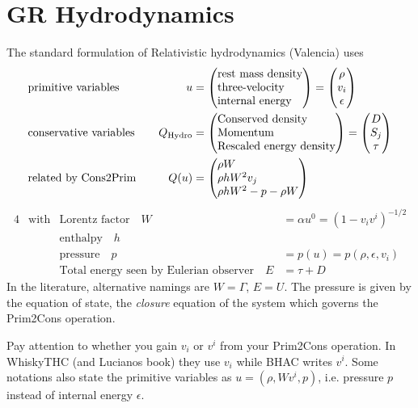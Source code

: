 \documentclass[a4paper]{article}
\newcommand{\desc}[1]{\text{#1}\quad}
\newcommand{\hydro}{\text{Hydro}}
\newenvironment{pvector}{\begin{pmatrix*}[l]}{\end{pmatrix*}}
\begin{document}
\section{GR Hydrodynamics}
The standard formulation of Relativistic hydrodynamics (Valencia)
uses
\begin{alignat}{4}
\label{eq.grhd.prim}
&\text{primitive variables}
&
\quad u &=
\begin{pvector}
\text{rest mass density} \\
\text{three-velocity} \\
\text{internal energy}
\end{pvector}
= \begin{pmatrix} \rho \\ v_i \\ \epsilon \end{pmatrix}
\\
\label{eq.grhd.cons}
&
\desc{conservative variables}
&
Q_\hydro
&=
\begin{pvector}
\text{Conserved density} \\
\text{Momentum} \\
\text{Rescaled energy density}
\end{pvector}
=
\begin{pmatrix} D \\ S_j \\ \tau \end{pmatrix}
\\
&
\desc{related by Cons2Prim}
&
Q(u)
&=
\begin{pvector}
\rho W \\
\rho h W^2 v_j \\
\rho h W^2 - p - \rho W
\end{pvector}
\end{alignat}
\begin{alignat}{4}
&\text{with}
&
\desc{Lorentz factor}
W&=\alpha u^0 = (1 - v_i v^i)^{-1/2}
\\
&&
\desc{enthalpy} h &
\\
&&
\desc{pressure} p &= p(u) = p(\rho,\epsilon, v_i)
\\
&&
\desc{Total energy seen by Eulerian observer} E
&= \tau + D
\end{alignat}
In the literature, alternative namings are $W=\Gamma$, $E=U$.
The pressure is given by the equation of state, the \emph{closure}
equation of the system which governs the Prim2Cons operation.

Pay attention to whether you gain $v_i$ or $v^i$ from your Prim2Cons
operation. In WhiskyTHC (and Lucianos book) they use $v_i$ while
BHAC writes $v^i$. Some notations also state the primitive
variables as $u=(\rho,W v^i, p)$, i.e. pressure $p$ instead of
internal energy $\epsilon$.
\end{document}
